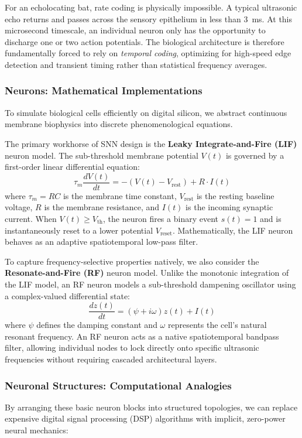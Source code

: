 For an echolocating bat, rate coding is physically impossible. A typical ultrasonic echo returns and passes across the sensory epithelium in less than 3~ms. At this microsecond timescale, an individual neuron only has the opportunity to discharge one or two action potentials. The biological architecture is therefore fundamentally forced to rely on \textit{temporal coding}, optimizing for high-speed edge detection and transient timing rather than statistical frequency averages.

\subsubsection{Neurons: Mathematical Implementations}
To simulate biological cells efficiently on digital silicon, we abstract continuous membrane biophysics into discrete phenomenological equations.

The primary workhorse of SNN design is the \textbf{Leaky Integrate-and-Fire (LIF)} neuron model. The sub-threshold membrane potential $V(t)$ is governed by a first-order linear differential equation:
\begin{equation}
    \tau_m \frac{dV(t)}{dt} = -(V(t) - V_{\text{rest}}) + R \cdot I(t)
  \label{eq:lif}
\end{equation}
where $\tau_m = RC$ is the membrane time constant, $V_{\text{rest}}$ is the resting baseline voltage, $R$ is the membrane resistance, and $I(t)$ is the incoming synaptic current. When $V(t) \ge V_{\text{th}}$, the neuron fires a binary event $s(t)=1$ and is instantaneously reset to a lower potential $V_{\text{reset}}$. Mathematically, the LIF neuron behaves as an adaptive spatiotemporal low-pass filter.

To capture frequency-selective properties natively, we also consider the \textbf{Resonate-and-Fire (RF)} neuron model. Unlike the monotonic integration of the LIF model, an RF neuron models a sub-threshold dampening oscillator using a complex-valued differential state:
\begin{equation}
    \frac{dz(t)}{dt} = (\psi + i\omega)z(t) + I(t)
\end{equation}
where $\psi$ defines the damping constant and $\omega$ represents the cell's natural resonant frequency. An RF neuron acts as a native spatiotemporal bandpass filter, allowing individual nodes to lock directly onto specific ultrasonic frequencies without requiring cascaded architectural layers.

\subsubsection{Neuronal Structures: Computational Analogies}
By arranging these basic neuron blocks into structured topologies, we can replace expensive digital signal processing (DSP) algorithms with implicit, zero-power neural mechanics:


